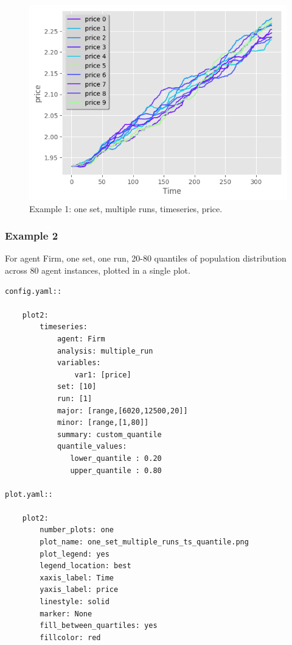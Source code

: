 \documentclass[10pt,a4paper]{article}
\begin{document}
\begin{figure}[b!]\centering\leavevmode
\includegraphics[scale=.7]{./plots_tut_2/one_set_multiple_runs_timeseries_price.png} 
\caption{\footnotesize  Example 1: one set, multiple runs, timeseries, price.}
\end{figure}

\clearpage
\subsubsection{Example 2}
For agent Firm, one set, one run, 20-80 quantiles of population distribution across 80 agent instances, plotted in a single plot.

\begin{lstlisting}
config.yaml::

    plot2:
        timeseries:
            agent: Firm
            analysis: multiple_run
            variables:
                var1: [price]
            set: [10]
            run: [1]
            major: [range,[6020,12500,20]]
            minor: [range,[1,80]] 
            summary: custom_quantile
            quantile_values:          
               lower_quantile : 0.20
               upper_quantile : 0.80

plot.yaml::

    plot2:
        number_plots: one
        plot_name: one_set_multiple_runs_ts_quantile.png
        plot_legend: yes
        legend_location: best
        xaxis_label: Time
        yaxis_label: price
        linestyle: solid
        marker: None
        fill_between_quartiles: yes
        fillcolor: red
\end{lstlisting}
\end{document}
